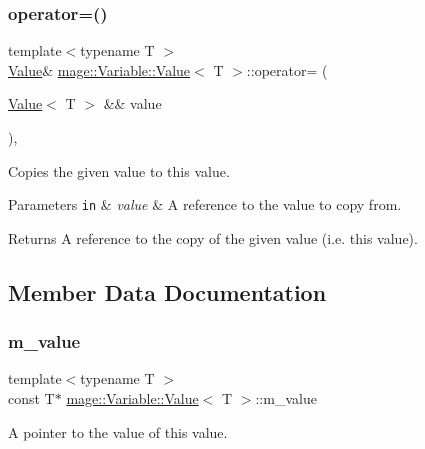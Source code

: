 \subsubsection{\texorpdfstring{operator=()}{operator=()}\hspace{0.1cm}{\footnotesize\ttfamily [2/2]}}
{\footnotesize\ttfamily template$<$typename T $>$ \\
\hyperlink{structmage_1_1_variable_1_1_value}{Value}\& \hyperlink{structmage_1_1_variable_1_1_value}{mage\+::\+Variable\+::\+Value}$<$ T $>$\+::operator= (\begin{DoxyParamCaption}\item[{\hyperlink{structmage_1_1_variable_1_1_value}{Value}$<$ T $>$ \&\&}]{value }\end{DoxyParamCaption})\hspace{0.3cm}{\ttfamily [private]}, {\ttfamily [delete]}}

Copies the given value to this value.


\begin{DoxyParams}[1]{Parameters}
\mbox{\tt in}  & {\em value} & A reference to the value to copy from. \\
\hline
\end{DoxyParams}
\begin{DoxyReturn}{Returns}
A reference to the copy of the given value (i.\+e. this value). 
\end{DoxyReturn}


\subsection{Member Data Documentation}
\hypertarget{structmage_1_1_variable_1_1_value_aa15243b8811b108a0c7bff05456e377c}{}\label{structmage_1_1_variable_1_1_value_aa15243b8811b108a0c7bff05456e377c} 
\subsubsection{\texorpdfstring{m\+\_\+value}{m\_value}}
{\footnotesize\ttfamily template$<$typename T $>$ \\
const T$\ast$ \hyperlink{structmage_1_1_variable_1_1_value}{mage\+::\+Variable\+::\+Value}$<$ T $>$\+::m\+\_\+value\hspace{0.3cm}{\ttfamily [private]}}

A pointer to the value of this value. 